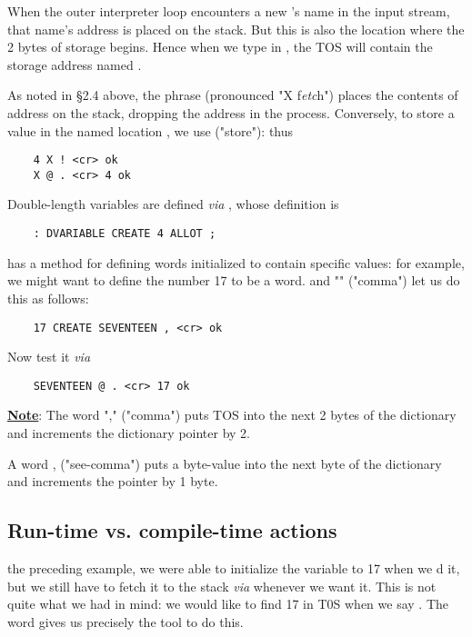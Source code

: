 When the outer interpreter loop encounters a new 's name in the input stream, that name’s address is placed on the stack. But this is also the location where the 2 bytes of storage begins. Hence when we type in , the TOS will contain the storage address named .

As noted in §2.4 above, the phrase  (pronounced "X f\textit{etc}h") places the contents of address  on the stack, dropping the address in the process. Conversely, to store a value in the named location , we use \bc{!} ("store"): thus
\begin{lstlisting}
    4 X ! <cr> ok
    X @ . <cr> 4 ok
\end{lstlisting}

Double-length variables are defined \textit{via} , whose definition is

\begin{lstlisting}
    : DVARIABLE CREATE 4 ALLOT ;
\end{lstlisting}

 has a method for defining words initialized to contain specific values: for example, we might want to define the number 17 to be a word.  and "\bc{,}" ("comma") let us do this as follows:

\begin{lstlisting}
    17 CREATE SEVENTEEN , <cr> ok
\end{lstlisting}

Now test it \textit{via}

\begin{lstlisting}
    SEVENTEEN @ . <cr> 17 ok
\end{lstlisting}

\underline{\textbf{Note}}: The word "," ("comma") puts TOS into the next 2 bytes of the dictionary and increments the dictionary pointer by 2.

A word , ("see-comma") puts a byte-value into the next byte of the dictionary and increments the pointer by 1 byte.

\subsection{Run-time vs. compile-time actions}

 the preceding example, we were able to initialize the variable  to 17 when we d it, but we still have to fetch it to the stack \textit{via}  whenever we want it. This is not quite what we had in mind: we would like to find 17 in T0S when we say . The word  gives us precisely the tool to do this.

